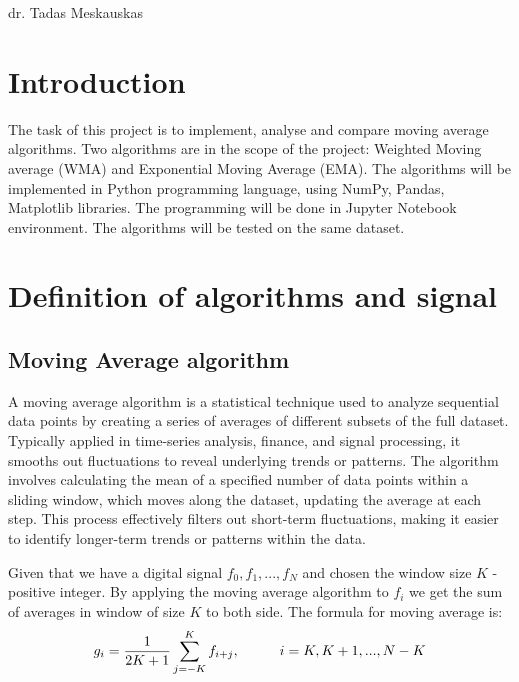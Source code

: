 \documentclass[a4paper,12pt,fleqn]{article}
\begin{document}
 {}{}{}{}%
{dr. Tadas Meskauskas}

\tableofcontents
\newpage


\section{Introduction}

\hspace{1em} The task of this project is to implement, analyse and compare moving average algorithms. Two algorithms
are in the scope of the project: Weighted Moving average (WMA) and Exponential Moving Average (EMA). The
algorithms will be implemented in Python programming language, using NumPy, Pandas, Matplotlib libraries. The
programming will be done in Jupyter Notebook environment. The algorithms will be tested on the same dataset.


\section{Definition of algorithms and signal}

\subsection{Moving Average algorithm}\label{MA}
\hspace{1em} A moving average algorithm is a statistical technique used to analyze sequential data points by creating 
a series of averages of different subsets of the full dataset. Typically applied in time-series analysis, 
finance, and signal processing, it smooths out fluctuations to reveal underlying trends or patterns. 
The algorithm involves calculating the mean of a specified number of data points within a sliding window,
which moves along the dataset, updating the average at each step. This process effectively filters out 
short-term fluctuations, making it easier to identify longer-term trends or patterns within the data.

Given that we have a digital signal \begin{math}
    f_0,f_1,...,f_N
\end{math} and chosen the window size \begin{math}
    K
    \end{math} - positive integer. By applying the moving average algorithm to \begin{math}
        f_i
    \end{math} we get the sum of averages in window of size \begin{math}
        K
    \end{math} to both side. The formula for moving average is:
    \begin{gather}\label{MA_equation}
        g_i = \frac{1}{2K+1} \sum_{j=-K}^{K} f_{i+j},\hspace{1 cm}i = K, K+1, ..., N-K
    \end{gather}
   
\end{document}
